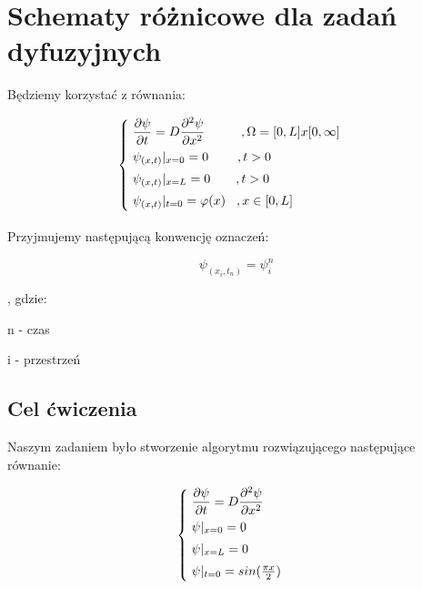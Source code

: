 \section{Schematy różnicowe dla zadań dyfuzyjnych}

Będziemy korzystać z równania:

\[
\begin{cases}
\vspace{0.1cm} 
\hspace{0,1cm} \dfrac{\partial \psi}{\partial t} = D\dfrac{\partial^2 \psi}{\partial x^2} \hspace{1cm}, \Omega = [0,L]x[0,\infty] \\
\vspace{0.1cm}
\hspace{0,1cm}\psi_{(x,t)}|_{x=0} = 0 \hspace{0.8cm},t>0 \\
\vspace{0.1cm} 
\hspace{0,1cm}\psi_{(x,t)}|_{x=L} = 0 \hspace{0.7cm},t>0 \\
\vspace{0.1cm} 
\hspace{0,1cm}\psi_{(x,t)}|_{t=0} = \varphi(x) \hspace{0.3cm},x\in[0,L]
\end{cases}
\]

Przyjmujemy następującą konwencję oznaczeń:

\fontsize{14}{2}

$$\psi_{(x_i,t_n)} = \psi^{n}_{i}$$

\fontsize{11}{1}

, gdzie:

n - czas

i - przestrzeń

\subsection{Cel ćwiczenia}

Naszym zadaniem było stworzenie algorytmu rozwiązującego następujące równanie:

\[
\begin{cases}
\vspace{0.1cm} 
\hspace{0,1cm} \dfrac{\partial \psi}{\partial t} = D\dfrac{\partial^2 \psi}{\partial x^2} \\
\vspace{0.1cm}
\hspace{0,1cm}\psi|_{x=0} = 0 \\
\vspace{0.1cm} 
\hspace{0,1cm}\psi|_{x=L} = 0 \\
\vspace{0.1cm} 
\hspace{0,1cm}\psi|_{t=0} = sin(\frac{\pi x}{2})
\end{cases}
\]

